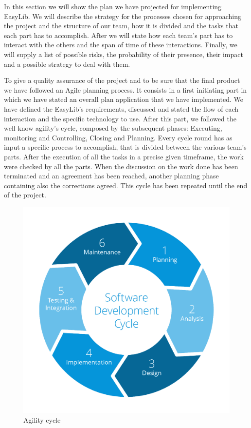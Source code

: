 \vspace*{-5mm}
In this section we will show the plan we have projected for implementing EasyLib. We will describe the strategy for the processes chosen for approaching the project and the structure of our team, how it is divided and the tasks that each part has to accomplish. After we will state how each team’s part has to interact with the others and the span of time of these interactions. Finally, we will supply a list of possible risks, the probability of their presence, their impact and a possible strategy to deal with them.

To give a quality assurance of the project and to be sure that the final product we have followed an Agile planning process. It consists in a first initiating part in which we have stated an overall plan application that we have implemented. We have defined the EasyLib’s requirements, discussed and stated the flow of each interaction and the specific technology to use. 
After this part, we followed the well know agility’s cycle, composed by the subsequent phases: Executing, monitoring and Controlling, Closing and Planning. Every cycle round has as input a specific process to accomplish, that is divided between the various team’s parts. After the execution of all the tasks in a precise given timeframe, the work were checked by all the parts. When the discussion on the work done has been terminated and an agreement has been reached, another planning phase containing also the corrections agreed. This cycle has been repeated until the end of the project.

\vspace*{0cm}
\begin{figure}[H]
	\centering
	\includegraphics[scale=0.21]{Images/Diagrams/agility_cycle}
	\caption{Agility cycle}
\end{figure}

